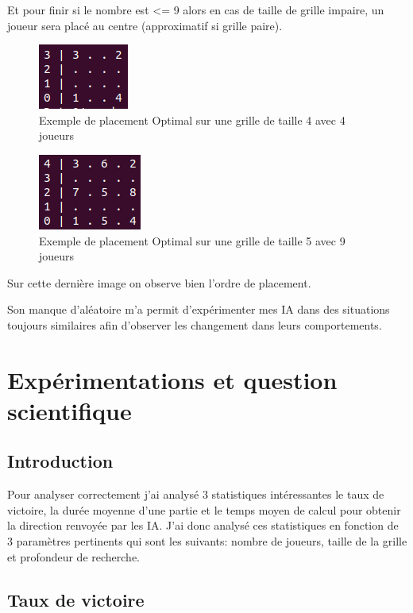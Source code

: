 \documentclass[a4paper,12pt]{article}
\begin{document}
Et pour finir si le nombre est <= 9 alors en cas de taille de grille impaire, un joueur sera placé au centre (approximatif si grille paire).

\begin{figure}[h!]
		\centering	\includegraphics[width=0.2\linewidth]{Optimale_1}
		\caption{Exemple de placement Optimal sur une grille de taille 4 avec 4 joueurs}
	\end{figure}
	
	\begin{figure}[h!]
		\centering	\includegraphics[width=0.2\linewidth]{Optimale_2}
		\caption{Exemple de placement Optimal sur une grille de taille 5 avec 9 joueurs}
	\end{figure}

Sur cette dernière image on observe bien l'ordre de placement.

Son manque d'aléatoire m'a permit d'expérimenter mes IA dans des situations toujours similaires afin d'observer les changement dans leurs comportements.
	
\newpage
\section{Expérimentations et question scientifique}
\subsection{Introduction}
Pour analyser correctement j'ai analysé 3 statistiques intéressantes le taux de victoire, la durée moyenne d'une partie et le temps moyen de calcul pour obtenir la direction renvoyée par les IA. J'ai donc analysé ces statistiques en fonction de 3 paramètres pertinents qui sont les suivants: nombre de joueurs, taille de la grille et profondeur de recherche.
\subsection{Taux de victoire}
\end{document}
